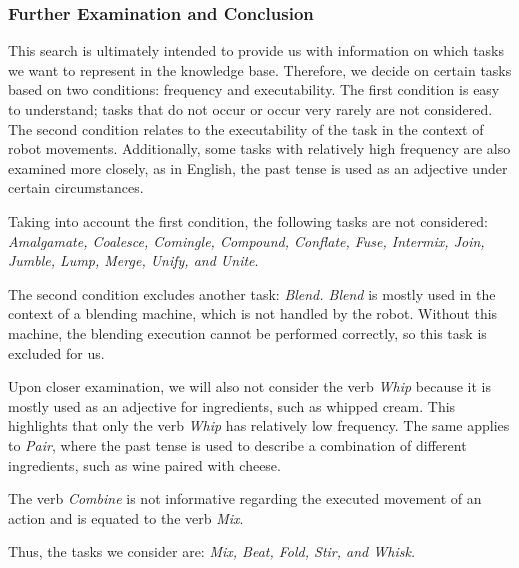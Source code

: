   \subsubsection{Further Examination and Conclusion}
  This search is ultimately intended to provide us with information on which tasks we want to represent in the knowledge base. Therefore, we decide on certain tasks based on two conditions: frequency and executability. The first condition is easy to understand; tasks that do not occur or occur very rarely are not considered. The second condition relates to the executability of the task in the context of robot movements. Additionally, some tasks with relatively high frequency are also examined more closely, as in English, the past tense is used as an adjective under certain circumstances.

Taking into account the first condition, the following tasks are not considered: \textit{Amalgamate, Coalesce, Comingle, Compound, Conflate, Fuse, Intermix, Join, Jumble, Lump, Merge, Unify, and Unite}.

The second condition excludes another task: \textit{Blend. Blend} is mostly used in the context of a blending machine, which is not handled by the robot. Without this machine, the blending execution cannot be performed correctly, so this task is excluded for us.

Upon closer examination, we will also not consider the verb \textit{Whip} because it is mostly used as an adjective for ingredients, such as whipped cream. This highlights that only the verb \textit{Whip} has relatively low frequency. The same applies to \textit{Pair}, where the past tense is used to describe a combination of different ingredients, such as wine paired with cheese.

The verb \textit{Combine} is not informative regarding the executed movement of an action and is equated to the verb \textit{Mix}.

Thus, the tasks we consider are: \textit{Mix, Beat, Fold, Stir, and Whisk.}

